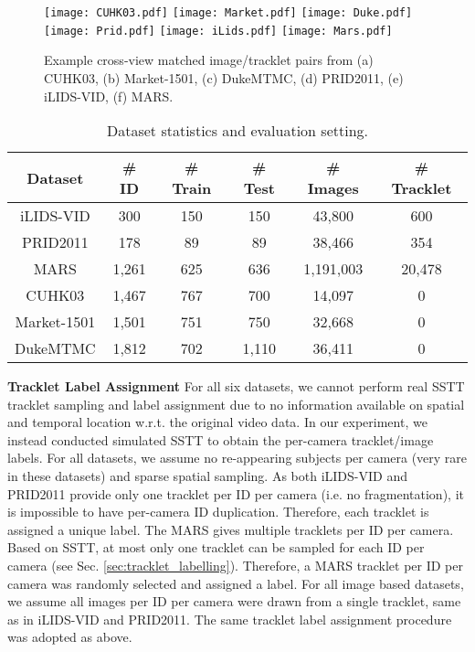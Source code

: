 \documentclass[runningheads]{llncs}
\begin{document}
\begin{figure}[t]
\centering
\texttt{[image: CUHK03.pdf]}
\texttt{[image: Market.pdf]}
\texttt{[image: Duke.pdf]}
\texttt{[image: Prid.pdf]}
\texttt{[image: iLids.pdf]}
\texttt{[image: Mars.pdf]}
\caption{Example cross-view matched image/tracklet pairs from 
	(a) CUHK03, (b) Market-1501, (c) DukeMTMC, (d) PRID2011, (e) iLIDS-VID, (f) MARS.
}
\label{fig:dataset_img}
\end{figure}


\begin{table}[h] 
	\centering
	\setlength{\tabcolsep}{0.25cm}
	\caption{
		Dataset statistics and
		evaluation setting.
	}
	\begin{tabular}{c||c|c|c|c|c}
		\hline 
		Dataset  & 
		{\# ID} & 
		{\# Train } & 
		{\# Test} &
		{\# Images} & 
		{\# Tracklet} \\ \hline \hline
		iLIDS-VID \cite{wang2014person}
		& 300 & 150 & 150 & 43,800 & 600 \\
		PRID2011 \cite{hirzer2011person}
		& 178 & 89 & 89 & 38,466 & 354 \\
		MARS \cite{zheng2016mars} 
		& 1,261 & 625 & 636 & 1,191,003 & 20,478 \\ 
		\hline
		CUHK03 \cite{li2014deepreid}
		& 1,467 & 767 & 700 & 14,097 & 0 \\
		Market-1501 \cite{zheng2015scalable}
		& 1,501& 751 & 750  & 32,668 & 0 \\
		DukeMTMC \cite{ristani2016MTMC}
		& 1,812 & 702 & 1,110 & 36,411 & 0\\
		\hline
	\end{tabular}
	\label{tab:dataset_stats}
\end{table}

\noindent \textbf{Tracklet Label Assignment }
For all six datasets, we cannot perform real SSTT tracklet sampling
and label assignment due to
no information available on spatial and temporal location w.r.t. the original video data.
In our experiment, we instead conducted simulated SSTT to 
obtain the per-camera tracklet/image labels.  
For all datasets, we assume no re-appearing subjects per camera (very
rare in these datasets)
and sparse spatial sampling.
As both iLIDS-VID and PRID2011
provide only one tracklet per ID per camera (i.e. no fragmentation),
it is impossible to have per-camera ID duplication.
Therefore, each tracklet is assigned a unique label.
The MARS gives multiple tracklets per ID per camera. 
Based on SSTT,
at most only one tracklet can be sampled for each ID per camera
(see Sec. \ref{sec:tracklet_labelling}).
Therefore, a MARS tracklet per ID per camera was randomly selected and
assigned a label.
For all {image based datasets}, 
we assume all images per ID per camera were drawn from 
a single tracklet, same as in iLIDS-VID and PRID2011.
The same tracklet label assignment procedure was adopted as above.
\end{document}
